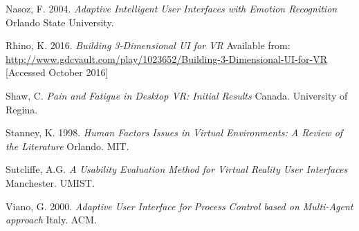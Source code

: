 \documentclass[12pt]{article}
\begin{document}
Nasoz, F. 2004. \emph{Adaptive Intelligent User Interfaces with Emotion Recognition} Orlando State University. 

Rhino, K. 2016. \emph{Building 3-Dimensional UI for VR} Available from: \url{http://www.gdcvault.com/play/1023652/Building-3-Dimensional-UI-for-VR} [Accessed October 2016]

Shaw, C. \emph{Pain and Fatigue in Desktop VR: Initial Results} Canada. University of Regina. 

Stanney, K. 1998. \emph{Human Factors Issues in Virtual Environments: A Review of the Literature} Orlando. MIT. 

Sutcliffe, A.G. \emph{A Usability Evaluation Method for Virtual Reality User Interfaces} Manchester. UMIST. 

Viano, G. 2000. \emph{Adaptive User Interface for Process Control based on Multi-Agent approach} Italy. ACM. 
\end{document}
